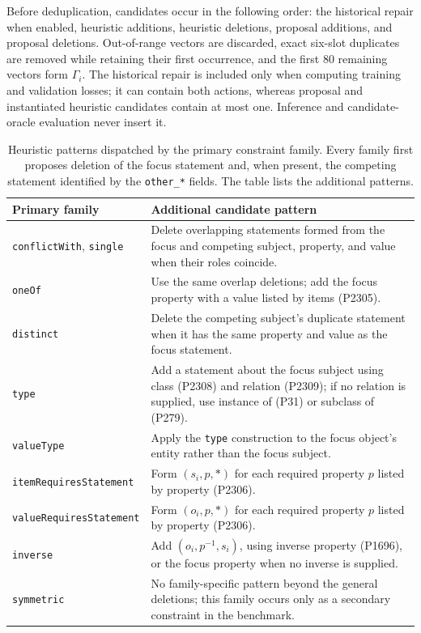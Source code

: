 \documentclass[a4paper,UKenglish,cleveref,autoref,thm-restate]{tgdk-v2021}
\begin{document}
Before deduplication, candidates occur in the following order: the historical repair when enabled, heuristic additions, heuristic deletions, proposal additions, and proposal deletions. Out-of-range vectors are discarded, exact six-slot duplicates are removed while retaining their first occurrence, and the first 80 remaining vectors form \(\Gamma_i\). The historical repair is included only when computing training and validation losses; it can contain both actions, whereas proposal and instantiated heuristic candidates contain at most one. Inference and candidate-oracle evaluation never insert it.

\begin{table}[ht]
\caption{Heuristic patterns dispatched by the primary constraint family. Every family first proposes deletion of the focus statement and, when present, the competing statement identified by the \texttt{other\_*} fields. The table lists the additional patterns.}
\label{tab:candidate-heuristics}
\centering
\scriptsize
\begin{tabularx}{\textwidth}{@{}p{}X@{}}
\toprule
\textbf{Primary family} & \textbf{Additional candidate pattern} \\
\midrule
\texttt{conflictWith}, \texttt{single} & Delete overlapping statements formed from the focus and competing subject, property, and value when their roles coincide. \\
\texttt{oneOf} & Use the same overlap deletions; add the focus property with a value listed by items (P2305). \\
\texttt{distinct} & Delete the competing subject's duplicate statement when it has the same property and value as the focus statement. \\
\texttt{type} & Add a statement about the focus subject using class (P2308) and relation (P2309); if no relation is supplied, use instance of (P31) or subclass of (P279). \\
\texttt{valueType} & Apply the \texttt{type} construction to the focus object's entity rather than the focus subject. \\
\texttt{itemRequiresStatement} & Form \((s_i,p,*)\) for each required property \(p\) listed by property (P2306). \\
\texttt{valueRequiresStatement} & Form \((o_i,p,*)\) for each required property \(p\) listed by property (P2306). \\
\texttt{inverse} & Add \((o_i,p^{-1},s_i)\), using inverse property (P1696), or the focus property when no inverse is supplied. \\
\texttt{symmetric} & No family-specific pattern beyond the general deletions; this family occurs only as a secondary constraint in the benchmark. \\
\bottomrule
\end{tabularx}
\end{table}
\end{document}
